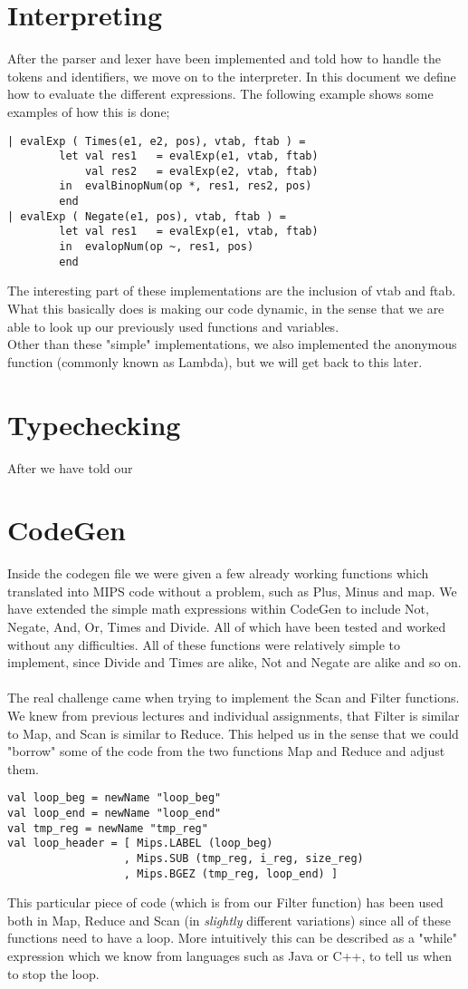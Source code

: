 \documentclass[12pt]{article}
\begin{document}
\section{Interpreting}
After the parser and lexer have been implemented and told how to handle the tokens and identifiers, we move on to the interpreter. In this document we define how to evaluate the different expressions. The following example shows some examples of how this is done;\\
\begin{verbatim}
| evalExp ( Times(e1, e2, pos), vtab, ftab ) =
        let val res1   = evalExp(e1, vtab, ftab)
            val res2   = evalExp(e2, vtab, ftab)
        in  evalBinopNum(op *, res1, res2, pos)
        end
| evalExp ( Negate(e1, pos), vtab, ftab ) =
        let val res1   = evalExp(e1, vtab, ftab)
        in  evalopNum(op ~, res1, pos)
        end
\end{verbatim}
The interesting part of these implementations are the inclusion of vtab and ftab. What this basically does is making our code dynamic, in the sense that we are able to look up our previously used functions and variables.\\
Other than these "simple" implementations, we also implemented the anonymous function (commonly known as Lambda), but we will get back to this later.
\section{Typechecking}
After we have told our
\pagebreak
\section{CodeGen}
Inside the codegen file we were given a few already working functions which translated into MIPS code without a problem, such as Plus, Minus and map. We have extended the simple math expressions within CodeGen to include Not, Negate, And, Or, Times and Divide. All of which have been tested and worked without any difficulties. All of these functions were relatively simple to implement, since Divide and Times are alike, Not and Negate are alike and so on.\\\\
The real challenge came when trying to implement the Scan and Filter functions. We knew from previous lectures and individual assignments, that Filter is similar to Map, and Scan is similar to Reduce. This helped us in the sense that we could "borrow" some of the code from the two functions Map and Reduce and adjust them.
\begin{verbatim}
val loop_beg = newName "loop_beg"
val loop_end = newName "loop_end"
val tmp_reg = newName "tmp_reg"
val loop_header = [ Mips.LABEL (loop_beg)
                  , Mips.SUB (tmp_reg, i_reg, size_reg)
                  , Mips.BGEZ (tmp_reg, loop_end) ]
\end{verbatim}
This particular piece of code (which is from our Filter function) has been used both in Map, Reduce and Scan (in \textit{slightly} different variations) since all of these functions need to have a loop. More intuitively this can be described as a "while" expression which we know from languages such as Java or C++, to tell us when to stop the loop. 
\end{document}
